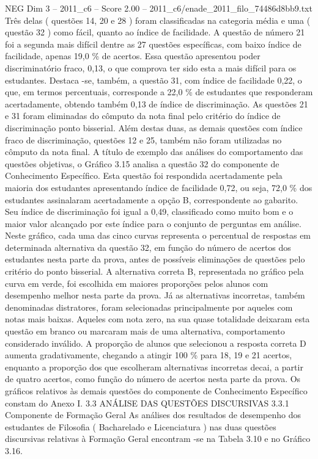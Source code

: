 \begin{textsample}{NEG Dim 3 – 2011\_c6 – Score 2.00 – 2011\_c6/enade\_2011\_filo\_74486d8bb9.txt}
Três delas ( questões 14, 20 e 28 ) foram classificadas na categoria média e uma ( questão 32 ) como fácil, quanto ao índice de facilidade.
A questão de número 21 foi a segunda mais difícil dentre as 27 questões específicas, com baixo índice de facilidade, apenas 19,0 \% de acertos.
Essa questão apresentou poder discriminatório fraco, 0,13, o que comprova ter sido esta a mais difícil para os estudantes.
Destaca -se, também, a questão 31, com índice de facilidade 0,22, o que, em termos percentuais, corresponde a 22,0 \% de estudantes que responderam acertadamente, obtendo também 0,13 de índice de discriminação.
As questões 21 e 31 foram eliminadas do cômputo da nota final pelo critério do índice de discriminação ponto bisserial.
Além destas duas, as demais questões com índice fraco de discriminação, questões 12 e 25, também não foram utilizadas no cômputo da nota final.
A título de exemplo das análises do comportamento das questões objetivas, o Gráfico 3.15 analisa a questão 32 do componente de Conhecimento Específico.
Esta questão foi respondida acertadamente pela maioria dos estudantes apresentando índice de facilidade 0,72, ou seja, 72,0 \% dos estudantes assinalaram acertadamente a opção B, correspondente ao gabarito.
Seu índice de discriminação foi igual a 0,49, classificado como muito bom e o maior valor alcançado por este índice para o conjunto de perguntas em análise.
Neste gráfico, cada uma das cinco curvas representa o percentual de respostas em determinada alternativa da questão 32, em função do número de acertos dos estudantes nesta parte da prova, antes de possíveis eliminações de questões pelo critério do ponto bisserial.
A alternativa correta B, representada no gráfico pela curva em verde, foi escolhida em maiores proporções pelos alunos com desempenho melhor nesta parte da prova.
Já as alternativas incorretas, também denominadas distratores, foram selecionadas principalmente por aqueles com notas mais baixas.
Aqueles com nota zero, na sua quase totalidade deixaram esta questão em branco ou marcaram mais de uma alternativa, comportamento considerado inválido.
A proporção de alunos que selecionou a resposta correta D aumenta gradativamente, chegando a atingir 100 \% para 18, 19 e 21 acertos, enquanto a proporção dos que escolheram alternativas incorretas decai, a partir de quatro acertos, como função do número de acertos nesta parte da prova.
Os gráficos relativos às demais questões do componente de Conhecimento Específico constam do Anexo I. 3.3 ANÁLISE DAS QUESTÕES DISCURSIVAS 3.3.1 Componente de Formação Geral As análises dos resultados de desempenho dos estudantes de Filosofia ( Bacharelado e Licenciatura ) nas duas questões discursivas relativas à Formação Geral encontram -se na Tabela 3.10 e no Gráfico 3.16.

\end{textsample}
